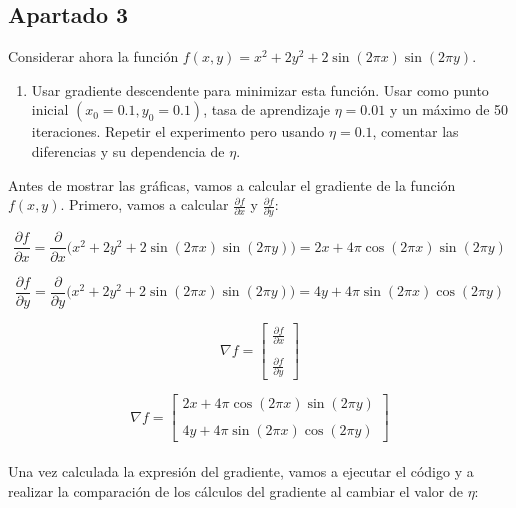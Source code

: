 \documentclass[11pt,a4paper]{article}
\begin{document}
\subsection*{Apartado 3}
\noindent Considerar ahora la función $f(x, y) = x^2 + 2y^2 + 2\sin(2 \pi x)\sin(2 \pi y)$.

\begin{enumerate}[label=\alph*)]
	\item Usar gradiente descendente para minimizar esta función. Usar como punto inicial $(x_0 = 0.1, y_0 = 0.1)$,
	tasa de aprendizaje $\eta = 0.01$ y un máximo de 50 iteraciones. Repetir el experimento pero usando $\eta = 0.1$,
	comentar las diferencias y su dependencia de $\eta$.
\end{enumerate}

Antes de mostrar las gráficas, vamos a calcular el gradiente de la función $f(x, y)$. Primero, vamos a calcular 
$\frac{\partial f}{\partial x}$ y $\frac{\partial f}{\partial y}$:

\begin{equation}
\frac{\partial f}{\partial x} = \frac{\partial}{\partial x} \Big(x^2 + 2y^2 + 2\sin(2 \pi x)\sin(2 \pi y)\Big) =
2x + 4 \pi \cos(2 \pi x)\sin(2 \pi y)
\end{equation}

\begin{equation}
\frac{\partial f}{\partial y} = \frac{\partial}{\partial y} \Big(x^2 + 2y^2 + 2\sin(2 \pi x)\sin(2 \pi y)\Big) =
4y + 4 \pi \sin(2 \pi x)\cos(2 \pi  y)
\end{equation}

\begin{equation}
\nabla f =
\left[
{
\begin{array}{c}
	\frac{\partial f}{\partial x} \\
	\\
	\frac{\partial f}{\partial y}
\end{array}
}
\right]
\end{equation}

\begin{equation}
\nabla f =
\left[
{
\begin{array}{c}
	2x + 4 \pi \cos(2 \pi x)\sin(2 \pi y) \\
	\\
	4y + 4 \pi \sin(2 \pi x)\cos(2 \pi  y)
\end{array}
}
\right]
\end{equation} \\

Una vez calculada la expresión del gradiente, vamos a ejecutar el código y a realizar la comparación de los cálculos 
del gradiente al cambiar el valor de $\eta$:
\end{document}
